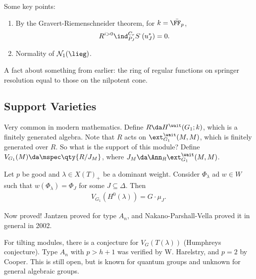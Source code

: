 \begin{remark}

Some key points:

\begin{enumerate}
\def\labelenumi{\arabic{enumi}.}
\item
  By the Gravert-Riemenschneider theorem, for \(k= \bar{\FF_p}\),
  \begin{align*}  
  R^{i>0} \ind_{P_J}^{C_r} S^\cdot(u_J^*) = 0
  .\end{align*}
\item
  Normality of \(\mathcal{N}_1(\lieg)\).
\end{enumerate}

A fact about something from earlier: the ring of regular functions on
springer resolution equal to those on the nilpotent cone.

\end{remark}

\hypertarget{support-varieties}{%
\subsection{Support Varieties}\label{support-varieties}}

Very common in modern mathematics. Define \(R \da H^\wait(G_1; k)\),
which is a finitely generated algebra. Note that \(R\) acts on
\(\ext_{G_1}^\wait(M, M)\), which is finitely generated over \(R\). So
what is the support of this module? Define
\(V_{G_1}(M) \da \mspec\qty{R/J_M}\), where
\(J_M \da \Ann_R \ext_{G_1}^\wait(M, M)\).

\begin{conjecture}[Jantzen, 1986]

Let \(p\) be good and \(\lambda \in X(T)_+\) be a dominant weight.
Consider \(\Phi_\lambda\) ad \(w\in W\) such that
\(w(\Phi_\lambda) = \Phi_J\) for some \(J \subseteq \Delta\). Then
\begin{align*}  
V_{G_1} (H^0(\lambda)) = G\cdot \mu_J
.\end{align*}

\end{conjecture}

\begin{remark}

Now proved! Jantzen proved for type \(A_n\), and Nakano-Parshall-Vella
proved it in general in 2002.

\end{remark}

\begin{remark}

For tilting modules, there is a conjecture for \(V_G(T(\lambda))\)
(Humphreys conjecture). Type \(A_n\) with \(p>h+1\) was verified by W.
Harelstry, and \(p=2\) by Cooper. This is still open, but is known for
quantum groups and unknown for general algebraic groups.

\end{remark}

